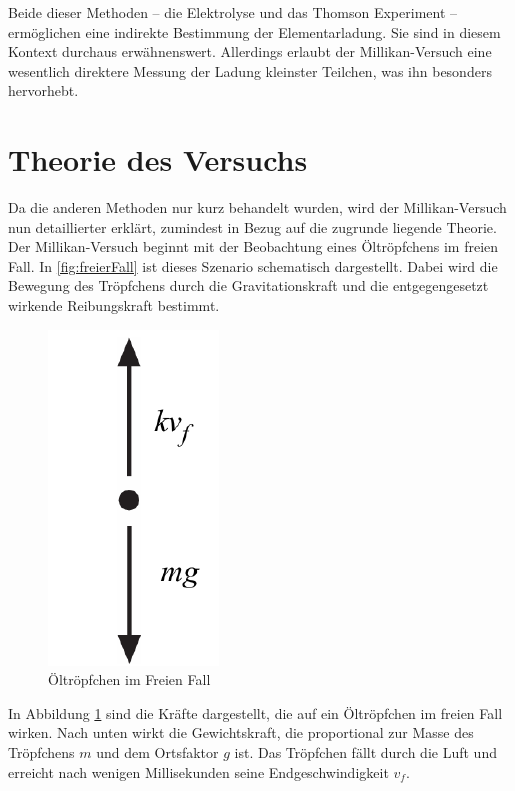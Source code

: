 Beide dieser Methoden – die Elektrolyse und das Thomson Experiment – ermöglichen eine indirekte Bestimmung der Elementarladung. Sie sind in diesem Kontext durchaus erwähnenswert. Allerdings erlaubt der Millikan-Versuch eine wesentlich direktere Messung der Ladung kleinster Teilchen, was ihn besonders hervorhebt.


\section{Theorie des Versuchs}\label{sec:versuchsTheorie}
Da die anderen Methoden nur kurz behandelt wurden, wird der Millikan-Versuch nun detaillierter erklärt, zumindest in Bezug auf die zugrunde liegende Theorie.\\

\noindent Der Millikan-Versuch beginnt mit der Beobachtung eines Öltröpfchens im freien Fall. In \autoref{fig:freierFall} ist dieses Szenario schematisch dargestellt. Dabei wird die Bewegung des Tröpfchens durch die Gravitationskraft und die entgegengesetzt wirkende Reibungskraft bestimmt.

\begin{figure}[h]
	\begin{center}
		\includegraphics[scale=0.5]{bilder/pdf/Abbildung1_FreierFall.pdf}
		\caption{Öltröpfchen im Freien Fall \parencite[1]{instructionManualHalogen}}
		\label{fig:freierFall}
	\end{center}
\end{figure}

\noindent In Abbildung \ref{fig:freierFall} sind die Kräfte dargestellt, die auf ein Öltröpfchen im freien Fall wirken. Nach unten wirkt die Gewichtskraft, die proportional zur Masse des Tröpfchens $m$ und dem Ortsfaktor $g$ ist. Das Tröpfchen fällt durch die Luft und erreicht nach wenigen Millisekunden seine Endgeschwindigkeit $v_f$.


